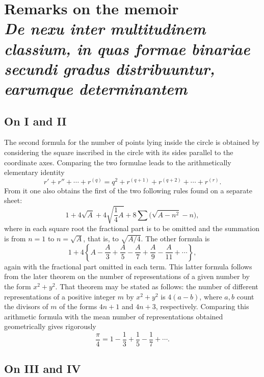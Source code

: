 \documentclass[12pt]{article}
\begin{document}
\section*{Remarks on the memoir\\
\emph{De nexu inter multitudinem classium, in quas formae binariae secundi gradus distribuuntur, earumque determinantem}}

\subsection*{On I and II}

The second formula for the number of points lying inside the circle is obtained by considering the square inscribed in the circle with its sides parallel to the coordinate axes. Comparing the two formulae leads to the arithmetically elementary identity
\[
r'+r''+\cdots+r^{(q)}=q^2+r^{(q+1)}+r^{(q+2)}+\cdots+r^{(r)}.
\]
From it one also obtains the first of the two following rules found on a separate sheet:
\[
1+4\sqrt{A}+4\sqrt{\frac14A}+8\sum\bigl(\sqrt{A-n^2}-n\bigr),
\]
where in each square root the fractional part is to be omitted and the summation is from \(n=1\) to \(n=\sqrt A\), that is, to \(\sqrt{A/4}\). The other formula is
\[
1+4\left\{A-\frac A3+\frac A5-\frac A7+\frac A9-\frac A{11}+\cdots\right\},
\]
again with the fractional part omitted in each term. This latter formula follows from the later theorem on the number of representations of a given number by the form \(x^2+y^2\). That theorem may be stated as follows: the number of different representations of a positive integer \(m\) by \(x^2+y^2\) is \(4(a-b)\), where \(a,b\) count the divisors of \(m\) of the forms \(4n+1\) and \(4n+3\), respectively. Comparing this arithmetic formula with the mean number of representations obtained geometrically gives rigorously
\[
\frac{\pi}{4}=1-\frac13+\frac15-\frac17+\cdots.
\]

\subsection*{On III and IV}
\end{document}
